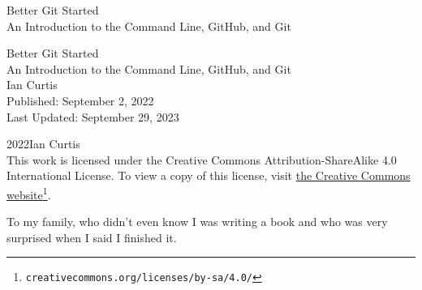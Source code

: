 \documentclass[oneside,10pt,]{book}
\newcommand{\titlepagefont}{\relax}
\begin{document}
\raggedbottom
\frontmatter
\thispagestyle{empty}
{\titlepagefont\centering
\vspace*{0.28\textheight}
{\Huge Better Git Started}\\[2\baselineskip]
{\LARGE An Introduction to the Command Line, GitHub, and Git}\\
}
\clearpage
\thispagestyle{empty}
{\titlepagefont\centering
\vspace*{0.14\textheight}
{\Huge Better Git Started}\\[\baselineskip]
{\LARGE An Introduction to the Command Line, GitHub, and Git}\\[3\baselineskip]
{\Large Ian Curtis}\\[3\baselineskip]
{\Large Published: September 2, 2022}\\[3\baselineskip]
{\Large Last Updated: September 29, 2023}\\}
\clearpage
\thispagestyle{empty}
\hypertarget{colophon-frontmatter-b}{}
\noindent\textcopyright{}2022\quad{}Ian Curtis\\[0.5\baselineskip]
This work is licensed under the Creative Commons Attribution-ShareAlike 4.0 International License. To view a copy of this license, visit \href{http://creativecommons.org/licenses/by-sa/4.0/}{the Creative Commons website}\footnote{\nolinkurl{creativecommons.org/licenses/by-sa/4.0/}\label{fn-frontmatter-b-a-c-b}}.\par\medskip
{}
\null\clearpage
\cleardoublepage
\thispagestyle{empty}
\begin{center}\Large%
To my family, who didn't even know I was writing a book and who was very surprised when I said I finished it.%
\end{center}
\clearpage
%
%
\typeout{************************************************}
\typeout{************************************************}
\end{document}
